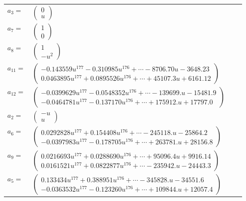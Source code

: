\documentclass[1p]{elsarticle_modified}
\theoremstyle{definition}
\begin{document}
\begin{tabular}{m{7pt} m{180pt} m{7pt} m{180pt} }
\flushright $a_{3}=$&$\begin{pmatrix}0\\u\end{pmatrix}$ \\
\flushright $a_{7}=$&$\begin{pmatrix}1\\0\end{pmatrix}$ \\
\flushright $a_{8}=$&$\begin{pmatrix}1\\- u^2\end{pmatrix}$ \\
\flushright $a_{11}=$&$\begin{pmatrix}-0.143559 u^{177}-0.310985 u^{176}+\cdots-8706.70 u-3648.23\\0.0463895 u^{177}+0.0895526 u^{176}+\cdots+45107.3 u+6161.12\end{pmatrix}$ \\
\flushright $a_{12}=$&$\begin{pmatrix}-0.0399629 u^{177}-0.0548352 u^{176}+\cdots-139699. u-15481.9\\-0.0464781 u^{177}-0.137170 u^{176}+\cdots+175912. u+17797.0\end{pmatrix}$ \\
\flushright $a_{2}=$&$\begin{pmatrix}- u\\u\end{pmatrix}$ \\
\flushright $a_{6}=$&$\begin{pmatrix}0.0292828 u^{177}+0.154408 u^{176}+\cdots-245118. u-25864.2\\-0.0397983 u^{177}-0.178705 u^{176}+\cdots+263781. u+28156.8\end{pmatrix}$ \\
\flushright $a_{9}=$&$\begin{pmatrix}0.0216693 u^{177}+0.0288690 u^{176}+\cdots+95096.4 u+9916.14\\0.0161521 u^{177}+0.0822877 u^{176}+\cdots-235942. u-24443.3\end{pmatrix}$ \\
\flushright $a_{5}=$&$\begin{pmatrix}0.133434 u^{177}+0.388951 u^{176}+\cdots-345828. u-34551.6\\-0.0363532 u^{177}-0.123260 u^{176}+\cdots+109844. u+12057.4\end{pmatrix}$ \\

\end{tabular}
\end{document}
